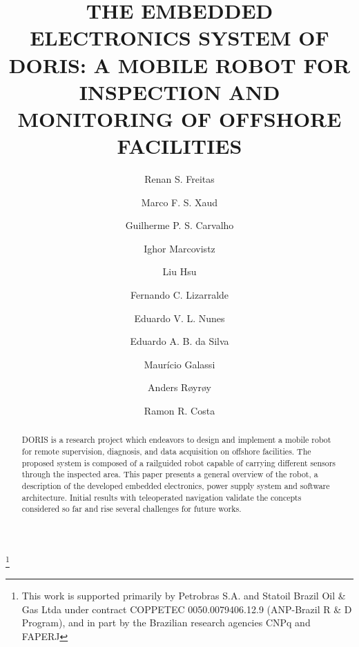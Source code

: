 \documentclass{ifacconf}
\begin{document}
\begin{frontmatter}

\title{THE EMBEDDED ELECTRONICS SYSTEM OF DORIS: A MOBILE ROBOT FOR INSPECTION AND MONITORING OF
OFFSHORE FACILITIES}

\thanks[footnoteinfo]{This work is supported primarily by Petrobras S.A. and
Statoil Brazil Oil \& Gas Ltda under contract COPPETEC 0050.0079406.12.9
(ANP-Brazil R \& D Program), and in part by the Brazilian research agencies CNPq
and FAPERJ}

\author[First]{Renan S. Freitas}
\author[Second]{Marco F. S. Xaud}
\author[Third]{Guilherme P. S. Carvalho}
\author[Forth]{Ighor Marcovistz}
\author[Fifth]{Liu Hsu}
\author[Sixth]{Fernando C. Lizarralde}
\author[Seventh]{Eduardo V. L. Nunes}
\author[Eigth]{Eduardo A. B. da Silva}
\author[Nineth]{Maurício Galassi}
\author[Tenth]{Anders R{\o}yr{\o}y}
\author[Eleventh]{Ramon R. Costa}

\address[First]{Research and Development Center, Petrobras/CENPES, Rio de
Janeiro, Brazil}
\address[Second]{Mathematical Sciences and Technology Department, Norwegian
University of Life Sciences, Oslo, Norwegian }
\address[Third]{Electrical
Engineering Department, COPPE UFRJ, Rio de Janeiro, Brazil, (e-mail: )}
\address[Forth]{TPD RD New Development Solutions, Statoil ASA}

\begin{abstract}                %
DORIS is a research project which endeavors to design and implement a mobile
robot for remote supervision, diagnosis, and data acquisition on offshore
facilities. The proposed system is composed of a railguided robot capable of
carrying different sensors through the inspected area. This paper presents a
general overview of the robot, a description of the developed embedded
electronics, power supply system and software architecture. Initial results
with teleoperated navigation validate the concepts considered so far and
rise several challenges for future works.
\end{abstract}


\end{frontmatter}
\end{document}
